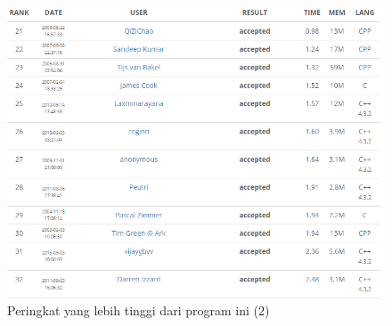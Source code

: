   \begin{figure}[H]
  \centering
  	\includegraphics[scale=0.55]{images/lampiran/rankdiatas2.png}
  	\caption{Peringkat yang lebih tinggi dari program ini (2)}
  	\label{fig:submission2}
  \end{figure}
  
  
  
 
  
  
